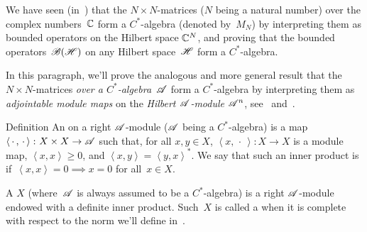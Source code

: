 \documentclass[a]{subfiles}
\begin{document}
\begin{parsec}%
\begin{point}%

We have seen (in~) that the $N\times N$-matrices
($N$ being a natural number) over the complex numbers~$\mathbb{C}$
form a $C^*$-algebra (denoted by~$M_N$) by interpreting
them as bounded operators on the Hilbert space $\mathbb{C}^N$,
and proving
that the bounded operators~$\mathscr{B}(\mathscr{H})$
on any Hilbert space~$\mathscr{H}$ form a $C^*$-algebra.

In this paragraph, we'll prove the analogous
and more general
result that the 
$N\times N$-matrices \emph{over a $C^*$-algebra~$\mathscr{A}$}
form a $C^*$-algebra by interpreting them
as \emph{adjointable module maps} on
the \emph{Hilbert $\mathscr{A}$-module} $\mathscr{A}^n$,
see~\sref{} and~\sref{}.
\end{point}
\begin{point}{Definition}%
An  on a right $\mathscr{A}$-module
($\mathscr{A}$ being a $C^*$-algebra) is a map
$\left<\,\cdot\,,\,\cdot\,\right>\colon X\times X\to\mathscr{A}$
such that, for all $x,y\in X$,
$\left<x,\,\cdot\,\right>\colon X\to X$
is a module map, $\left<x,x\right>\geq 0$,
and $\left<x,y\right>=\left<y,x\right>^*$.
We say that such an inner product is 
if~$\left<x,x\right>=0\implies x=0$ for all~$x\in X$.

A  $X$
(where~$\mathscr{A}$ is always assumed to be a $C^*$-algebra)
is a right $\mathscr{A}$-module endowed with a definite inner product.
Such~$X$ is called
a 
when it is complete
with respect to
the norm we'll define in~\sref{}.


\end{point}
\end{parsec}
\end{document}
